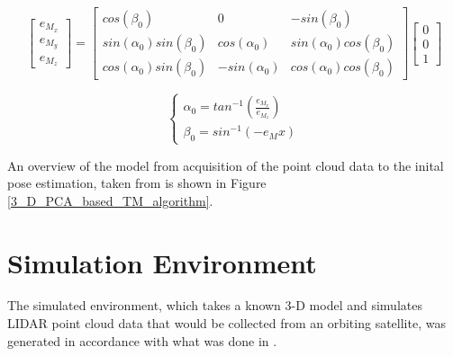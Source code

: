 \documentclass[conference]{IEEEtran}
\begin{document}
		\begin{equation}
			\label{eqn:estimated_axes}
			\begin{bmatrix} e_{M_x} \\ e_{M_y} \\ e_{M_z} \end{bmatrix}
			=
			\begin{bmatrix}
				cos(\beta_0)  & 0 & -sin(\beta_0) \\
				sin(\alpha_0)sin(\beta_0) & cos(\alpha_0) & sin(\alpha_0)cos(\beta_0) \\
				cos(\alpha_0)sin(\beta_0) & -sin(\alpha_0) & cos(\alpha_0)cos(\beta_0)
			\end{bmatrix}
			\begin{bmatrix} 0 \\ 0 \\ 1 \end{bmatrix}
		\end{equation}
		
		\begin{equation}
			\label{eqn:estimated_roll_pitch}
			\begin{cases}
				\alpha_0 = tan^{-1}(\frac{e_{M_x}}{e_{M_z}}) \\
				\beta_0 = sin^{-1}(-e_Mx)
			\end{cases} 
		\end{equation}
		
		
		An overview of the model from acquisition of the point cloud data to the inital pose estimation, taken from \cite{2017_pose_pca} is shown in Figure \ref{3_D_PCA_based_TM_algorithm}.


	\section{Simulation Environment}
		The simulated environment, which takes a known 3-D model and simulates LIDAR point cloud data that would be collected from an orbiting satellite, was generated in accordance with what was done in \cite{liu2016point}.
\end{document}
